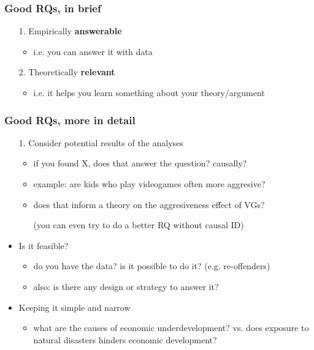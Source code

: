 \documentclass[aspectratio=43]{beamer}
\begin{document}
\begin{frame}
\frametitle{Good RQs, in brief}
\centering

\begin{itemize}
  \item[1.] Empirically \textbf{answerable}
  \begin{itemize}
    \item i.e. you can answer it with data
  \end{itemize}
  \item[2.] Theoretically \textbf{relevant}
  \begin{itemize}
    \item i.e. it helps you learn something about your theory/argument
  \end{itemize}
\end{itemize}

\end{frame}

\begin{frame}
\frametitle{Good RQs, more in detail}
\centering

\begin{itemize}
  \item[1.] Consider potential results of the analyses
  \begin{itemize}
    \item if you found X, does that answer the question? causally?
    \item example: are kids who play videogames often more aggresive?
    \item does that inform a theory on the aggresiveness effect of VGs?
    \item[] (you can even try to do a better RQ without causal ID)
  \end{itemize}
  \item<2->[2.] Is it feasible?
  \begin{itemize}
    \item do you have the data? is it possible to do it? (e.g. re-offenders)
    \item also: is there any design or strategy to answer it?
  \end{itemize}
  \item<3->[3.] Keeping it simple and narrow
  \begin{itemize}
    \item what are the causes of economic underdevelopment? vs. does exposure to natural disasters hinders economic development?
  \end{itemize}
\end{itemize}

\end{frame}
\end{document}
